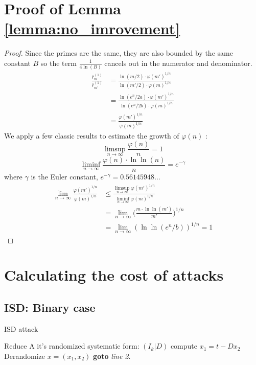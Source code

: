 \documentclass[12pt]{article}
\begin{document}
\section{Proof of Lemma \ref{lemma:no_imrovement}}
\label{app:B}
\begin{proof}
Since the primes are the same, they are also bounded by the same constant $B$ so the term $\frac{1}{4 \ln(B)}$ cancels out in the numerator and denominator.
\[
\begin{split}
\frac{\bar r_{m}^{(1)}}{\bar r_{m'}^{(1)}}
& = \frac{\ln(m/2) \cdot \varphi(m')^{1/n}}{\ln(m'/2) \cdot \varphi(m)^{1/n}} \\
& = \frac{\ln(e^n/2a) \cdot \varphi(m')^{1/n}}{\ln(e^n/2b) \cdot \varphi(m)^{1/n}} \\
& = \frac{\varphi(m')^{1/n}}{\varphi(m)^{1/n}}
\end{split}
\]
We apply a few classic results to estimate the growth of $\varphi(n)$ \cite{[HW09]}:
\[
    \limsup\limits_{n \rightarrow \infty} \frac{\varphi(n)}{n} = 1
\]
\[
    \liminf\limits_{n \rightarrow \infty} \frac{\varphi(n) \cdot \ln\ln(n)}{n} = e^{-\gamma}
\]
where $\gamma$ is the Euler constant, $e^{-\gamma} = 0.56145948\dots$
\[
\begin{split}
\lim_{n \rightarrow \infty} \frac{\varphi(m')^{1/n}}{\varphi(m)^{1/n}}
& \leq \frac{\limsup\limits_{n \rightarrow \infty} \varphi(m')^{1/n}}{\liminf\limits_{n \rightarrow\infty}\varphi(m)^{1/n}} \\
& = \lim_{n \rightarrow \infty} \bigg(\frac{m \cdot \ln\ln (m')}{m'}\bigg)^{1/n} \\
& = \lim_{n \rightarrow \infty} (\ln\ln(e^n/b))^{1/n} = 1
\end{split}
\]
\end{proof}
\section{Calculating the cost of attacks}
\label{app:A}

\subsection{ISD: Binary case}

\begin{algorithm}
\caption{ISD attack}\label{alg:ISD}
\begin{algorithmic}[1]
    \State Reduce A it's randomized systematic form: $(I_k |D)$
        \State compute $x_1 = t - Dx_2$
        \State \Return Derandomize $x = (x_1, x_2)$
        \EndIf
    \EndFor
\State \textbf{goto} \emph{line 2}.
\EndProcedure
\end{algorithmic}
\end{algorithm}
\end{document}
